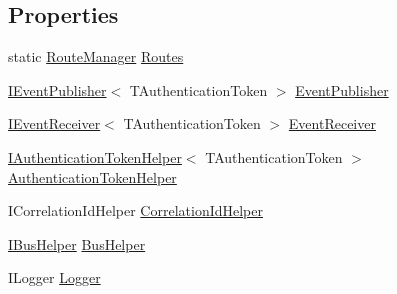\subsection*{Properties}
\begin{DoxyCompactItemize}
\item 
static \hyperlink{classCqrs_1_1Bus_1_1RouteManager}{Route\+Manager} \hyperlink{classCqrs_1_1Akka_1_1Events_1_1AkkaEventBus_a22f195a654564335ffa5f6df01b8af8d_a22f195a654564335ffa5f6df01b8af8d}{Routes}
\item 
\hyperlink{interfaceCqrs_1_1Events_1_1IEventPublisher}{I\+Event\+Publisher}$<$ T\+Authentication\+Token $>$ \hyperlink{classCqrs_1_1Akka_1_1Events_1_1AkkaEventBus_a763ef1bf4f3d48ad066a38e576e2d7f0_a763ef1bf4f3d48ad066a38e576e2d7f0}{Event\+Publisher}
\item 
\hyperlink{interfaceCqrs_1_1Events_1_1IEventReceiver}{I\+Event\+Receiver}$<$ T\+Authentication\+Token $>$ \hyperlink{classCqrs_1_1Akka_1_1Events_1_1AkkaEventBus_a8e2deeb33b6c6cbc59bec0e0786d5b71_a8e2deeb33b6c6cbc59bec0e0786d5b71}{Event\+Receiver}
\item 
\hyperlink{interfaceCqrs_1_1Authentication_1_1IAuthenticationTokenHelper}{I\+Authentication\+Token\+Helper}$<$ T\+Authentication\+Token $>$ \hyperlink{classCqrs_1_1Akka_1_1Events_1_1AkkaEventBus_a03166dfca723430ae548e833a2262632_a03166dfca723430ae548e833a2262632}{Authentication\+Token\+Helper}
\item 
I\+Correlation\+Id\+Helper \hyperlink{classCqrs_1_1Akka_1_1Events_1_1AkkaEventBus_a5a0e9b6c2c2c5bccb917afabddbee1a8_a5a0e9b6c2c2c5bccb917afabddbee1a8}{Correlation\+Id\+Helper}
\item 
\hyperlink{interfaceCqrs_1_1Bus_1_1IBusHelper}{I\+Bus\+Helper} \hyperlink{classCqrs_1_1Akka_1_1Events_1_1AkkaEventBus_a04311f852422c212c4dfa35e8cc21e2e_a04311f852422c212c4dfa35e8cc21e2e}{Bus\+Helper}
\item 
I\+Logger \hyperlink{classCqrs_1_1Akka_1_1Events_1_1AkkaEventBus_a0bbdde7f2011707581db6a66cd73c5c4_a0bbdde7f2011707581db6a66cd73c5c4}{Logger}
\end{DoxyCompactItemize}


